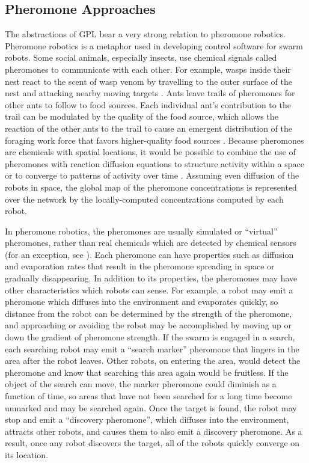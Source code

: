 \subsection{Pheromone Approaches}

The abstractions of GPL bear a very strong relation to pheromone robotics. 
Pheromone robotics is a metaphor used in developing control software for swarm robots. 
Some social animals, especially insects, use chemical signals called pheromones to communicate with each other. 
For example, wasps inside their nest react to the scent of wasp venom by travelling to the outer surface of the nest and attacking nearby moving targets  \citep{jeanne1981alarm}.
Ants leave trails of pheromones for other ants to follow to food sources. 
Each individual ant's contribution to the trail can be modulated by the quality of the food source, which allows the reaction of the other ants to the trail to cause an emergent distribution of the foraging work force that favors higher-quality food sources \citep{sumpter2003nonlinearity}.
Because pheromones are chemicals with spatial locations, it would be possible to combine the use of pheromones with reaction diffusion equations to structure activity within a space or to converge to patterns of activity over time  \citep{turing1952chemical}. 
Assuming even diffusion of the robots in space, the global map of the pheromone concentrations is represented over the network by the locally-computed concentrations computed by each robot.

In pheromone robotics, the pheromones are usually simulated or ``virtual'' pheromones, rather than real chemicals which are detected by chemical sensors (for an exception, see \citep{hayes2001swarm}). 
Each pheromone can have properties such as diffusion and evaporation rates that result in the pheromone spreading in space or gradually disappearing. 
In addition to its properties, the pheromones may have other characteristics which robots can sense. 
For example, a robot may emit a pheromone which diffuses into the environment and evaporates quickly, so distance from the robot can be determined by the strength of the pheromone, and approaching or avoiding the robot may be accomplished by moving up or down the gradient of pheromone strength. 
If the swarm is engaged in a search, each searching robot may emit a ``search marker'' pheromone that lingers in the area after the robot leaves. 
Other robots, on entering the area, would detect the pheromone and know that searching this area again would be fruitless. 
If the object of the search can move, the marker pheromone could diminish as a function of time, so areas that have not been searched for a long time become unmarked and may be searched again. 
Once the target is found, the robot may stop and emit a ``discovery pheromone'', which diffuses into the environment, attracts other robots, and causes them to also emit a discovery pheromone. 
As a result, once any robot discovers the target, all of the robots quickly converge on its location. 

